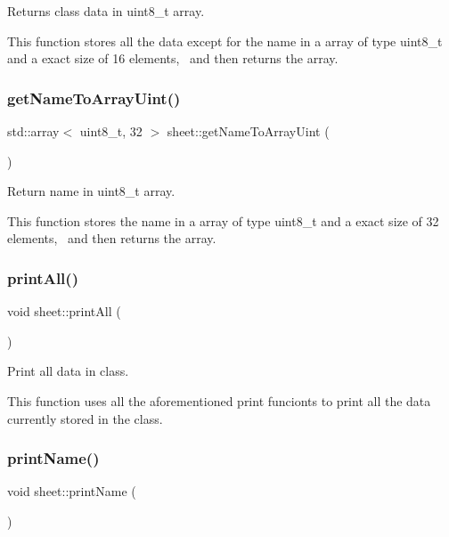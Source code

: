 Returns class data in uint8\+\_\+t array. 

This function stores all the data except for the name in a array of type uint8\+\_\+t and a exact size of 16 elements,~\newline
and then returns the array. \mbox{\label{classsheet_a83692af2c0ec0962a3c92e679a8f8648}} 
\subsubsection{\texorpdfstring{get\+Name\+To\+Array\+Uint()}{getNameToArrayUint()}}
{\footnotesize\ttfamily std\+::array$<$ uint8\+\_\+t, 32 $>$ sheet\+::get\+Name\+To\+Array\+Uint (\begin{DoxyParamCaption}{ }\end{DoxyParamCaption})}



Return name in uint8\+\_\+t array. 

This function stores the name in a array of type uint8\+\_\+t and a exact size of 32 elements,~\newline
and then returns the array. \mbox{\label{classsheet_a9689c670d509517bfe17c1b8941aaaaf}} 
\subsubsection{\texorpdfstring{print\+All()}{printAll()}}
{\footnotesize\ttfamily void sheet\+::print\+All (\begin{DoxyParamCaption}{ }\end{DoxyParamCaption})}



Print all data in class. 

This function uses all the aforementioned print funcionts to print all the data currently stored in the class. \mbox{\label{classsheet_a39028f2eb082d2b50bfa05873767de52}} 
\subsubsection{\texorpdfstring{print\+Name()}{printName()}}
{\footnotesize\ttfamily void sheet\+::print\+Name (\begin{DoxyParamCaption}{ }\end{DoxyParamCaption})}



